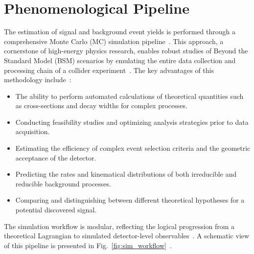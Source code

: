 \section{Phenomenological Pipeline}

The estimation of signal and background event yields is performed through a comprehensive Monte Carlo (MC) simulation pipeline~\cite{Christensen:2008py,Alloul:2013bka,Degrande:2011ua,Alwall:2014hca}. This approach, a cornerstone of high-energy physics research, enables robust studies of Beyond the Standard Model (BSM) scenarios by emulating the entire data collection and processing chain of a collider experiment~\cite{Sjostrand:2014zea,deFavereau:2013fsa}. The key advantages of this methodology include~\cite{Alwall:2014hca,Cacciari:2011ma}:

\begin{itemize}
    \item The ability to perform automated calculations of theoretical quantities such as cross-sections and decay widths for complex processes.
    \item Conducting feasibility studies and optimizing analysis strategies prior to data acquisition.
    \item Estimating the efficiency of complex event selection criteria and the geometric acceptance of the detector.
    \item Predicting the rates and kinematical distributions of both irreducible and reducible background processes.
    \item Comparing and distinguishing between different theoretical hypotheses for a potential discovered signal.
\end{itemize}

The simulation workflow is modular, reflecting the logical progression from a theoretical Lagrangian to simulated detector-level observables~\cite{Christensen:2008py,Alloul:2013bka,Degrande:2011ua,Alwall:2014hca}. A schematic view of this pipeline is presented in Fig.~\ref{fig:sim_workflow}~\cite{Alwall:2014hca,deFavereau:2013fsa}.

